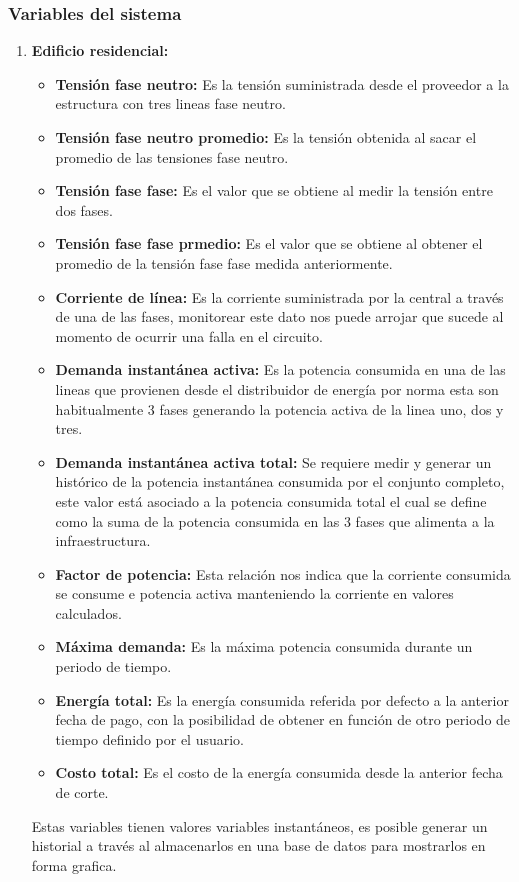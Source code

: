     \subsubsection{Variables del sistema}
    \begin{enumerate}
        \item \textbf{Edificio residencial:}

        \begin{itemize}
            \item \textbf{Tensión fase neutro:} Es la tensión suministrada desde el proveedor a la estructura con tres lineas fase
            neutro.
            \item \textbf{Tensión fase neutro promedio:} Es la tensión obtenida al sacar el promedio de las tensiones fase neutro.
            \item \textbf{Tensión fase fase:} Es el valor que se obtiene al medir la tensión entre dos fases.
            \item \textbf{Tensión fase fase prmedio:} Es el valor que se obtiene al obtener el promedio de la tensión fase fase medida anteriormente.
            \item \textbf{Corriente de línea:} Es la corriente suministrada por la central a través de una de las fases, monitorear
            este dato nos puede arrojar que sucede al momento de ocurrir una falla en el circuito.
            \item \textbf{Demanda instantánea activa:} Es la potencia consumida en una de las lineas que provienen desde el 
            distribuidor de energía por norma esta son habitualmente 3 fases generando la potencia activa de la linea uno, dos 
            y tres.
            \item \textbf{Demanda instantánea  activa total:} Se requiere medir y generar un histórico de la potencia instantánea consumida 
            por el conjunto completo, este valor está asociado a la potencia consumida total el cual se define como la suma de 
            la potencia consumida en las 3 fases que alimenta a la infraestructura. 
            \item \textbf{Factor de potencia:} Esta relación nos indica que la corriente consumida se consume e potencia activa 
            manteniendo la corriente en valores calculados.
            \item \textbf{Máxima demanda:} Es la máxima potencia consumida durante un periodo de tiempo.
            \item \textbf{Energía total:} Es la energía consumida referida por defecto a la anterior fecha de pago, con la posibilidad 
            de obtener en función de otro periodo de tiempo definido por el usuario. 
            \item \textbf{Costo total:} Es el costo de la energía consumida desde la anterior fecha de corte.
        \end{itemize}
        Estas variables tienen valores variables instantáneos, es posible generar un historial a través al almacenarlos en una 
        base de datos para mostrarlos en forma grafica.


\end{enumerate}
